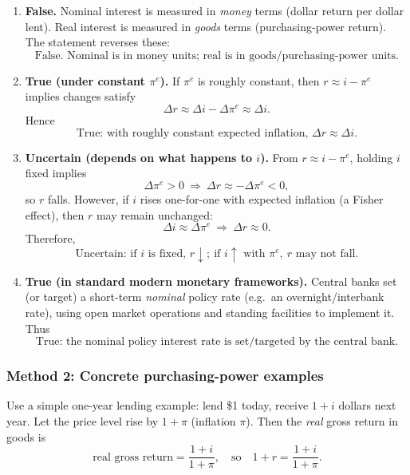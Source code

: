 \documentclass[12pt]{article}
\begin{document}
\begin{enumerate}[label=(\alph*)]
\item \textbf{False.}
Nominal interest is measured in \emph{money} terms (dollar return per dollar lent). Real interest is measured in \emph{goods} terms (purchasing-power return). The statement reverses these:
\[
\boxed{\,\text{False. Nominal is in money units; real is in goods/purchasing-power units.}\,}
\]

\item \textbf{True (under constant \(\pi^e\)).}
If \(\pi^e\) is roughly constant, then \(r \approx i - \pi^e\) implies changes satisfy
\[
\Delta r \approx \Delta i - \Delta \pi^e \approx \Delta i.
\]
Hence
\[
\boxed{\,\text{True: with roughly constant expected inflation, }\Delta r \approx \Delta i.\,}
\]

\item \textbf{Uncertain (depends on what happens to \(i\)).}
From \(r \approx i - \pi^e\), holding \(i\) fixed implies
\[
\Delta \pi^e>0 \ \Longrightarrow\ \Delta r \approx -\Delta \pi^e < 0,
\]
so \(r\) falls. However, if \(i\) rises one-for-one with expected inflation (a Fisher effect), then \(r\) may remain unchanged:
\[
\Delta i \approx \Delta \pi^e \ \Longrightarrow\ \Delta r \approx 0.
\]
Therefore,
\[
\boxed{\,\text{Uncertain: if }i\text{ is fixed, }r\downarrow;\ \text{if }i\uparrow\text{ with }\pi^e,\ r\text{ may not fall.}\,}
\]

\item \textbf{True (in standard modern monetary frameworks).}
Central banks set (or target) a short-term \emph{nominal} policy rate (e.g.\ an overnight/interbank rate), using open market operations and standing facilities to implement it. Thus
\[
\boxed{\,\text{True: the nominal policy interest rate is set/targeted by the central bank.}\,}
\]
\end{enumerate}

\subsubsection*{Method 2: Concrete purchasing-power examples}
Use a simple one-year lending example: lend \$1 today, receive \(1+i\) dollars next year. Let the price level rise by \(1+\pi\) (inflation \(\pi\)). Then the \emph{real} gross return in goods is
\[
\text{real gross return}=\frac{1+i}{1+\pi},
\quad\text{so}\quad
1+r=\frac{1+i}{1+\pi}.
\]
\end{document}
